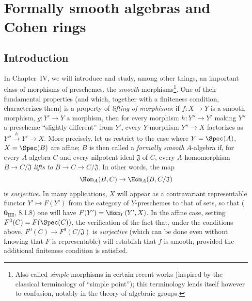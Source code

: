 \section{Formally smooth algebras and Cohen rings}
\label{section:0.19}
\label{0.19}

\subsection{Introduction}
\label{subsection:0.19.0}
\label{0.19.0}

\begin{env}[19.0.1]
\label{0.19.0.1}
In Chapter~IV, we will introduce and study, among other things, an important class of morphisms of preschemes, the \emph{smooth} morphisms\footnote{Also called \emph{simple} morphisms in certain recent works (inspired by the classical terminology of ``simple point''); this terminology lends itself however to confusion, notably in the theory of algebraic groups.}.
One of their fundamental properties (and which, together with a finiteness condition, characterizes them) is a property of \emph{lifting of morphisms}:
if $f:X\to Y$ is a smooth morphism, $g:Y'\to Y$ a morphism, then for every morphism $h:Y''\to Y'$ making $Y''$ a prescheme ``slightly different'' from $Y'$, every $Y$-morphism $Y''\to X$ factorizes as $Y''\xrightarrow{h}Y'\to X$.
More precisely, let us restrict to the case where $Y=\Spec(A)$, $X=\Spec(B)$ are affine;
$B$ is then called a \emph{formally smooth} $A$-algebra if, for every $A$-algebra $C$ and every nilpotent ideal $\mathfrak{J}$ of $C$, every $A$-homomorphism $B\to C/\mathfrak{J}$ \emph{lifts to} $B\to C\to C/\mathfrak{J}$.
In other words, the map
\[
  \Hom_A(B,C) \to \Hom_A(B,C/\mathfrak{J})
\]
is \emph{surjective}.
In many applications, $X$ will appear as a contravariant representable functor $Y'\mapsto F(Y')$ from the category of $Y$-preschemes to that of sets, so that ($\mathbf{0_{III}}$, 8.1.8) one will have $F(Y')=\Hom_Y(Y',X)$.
In the affine case, setting $F^0(C)=F(\Spec(C))$, the verification of the fact that, under the conditions above, $F^0(C)\to F^0(C/\mathfrak{J})$ is \emph{surjective} (which can be done even without knowing that $F$ is representable) will establish that $f$ is smooth, provided the additional finiteness condition is satisfied.
\end{env}

